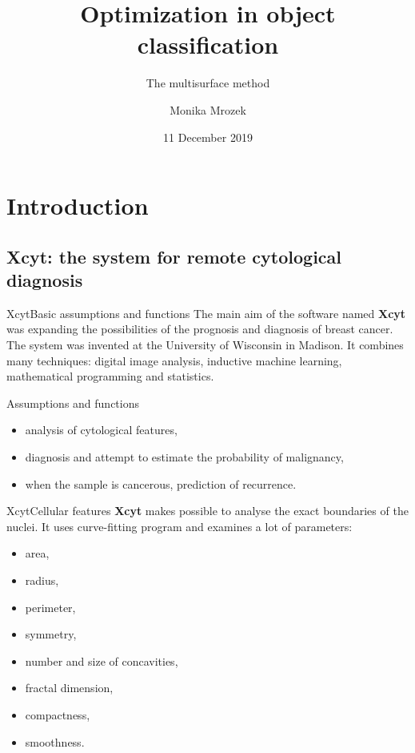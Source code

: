 \documentclass{beamer}
\begin{document}
\title{Optimization in object classification}
\subtitle{The multisurface method}
\author{Monika Mrozek} 
\date{11 December 2019} 

\frame{\titlepage} 


\section{Introduction}

\subsection{Xcyt: the system for remote cytological diagnosis}
\begin{frame}{Xcyt}{Basic assumptions and functions}
The main aim of the software named \textbf{Xcyt} was expanding the possibilities of the prognosis and diagnosis of breast cancer. The system was invented at the University of Wisconsin in Madison\cite{s}. It combines many techniques: digital image analysis, inductive machine learning, mathematical programming and statistics.

\begin{block}{Assumptions and functions}
\begin{itemize}
   \item analysis of cytological features,
   \item diagnosis and attempt to estimate the probability of malignancy,
   \item when the sample is cancerous, prediction of recurrence.
\end{itemize}
\end{block}
\end{frame}


\begin{frame}{Xcyt}{Cellular features}
\textbf{Xcyt} makes possible to analyse the exact boundaries of the nuclei. It uses curve-fitting program 
and examines a lot of parameters:
\begin{block}

\begin{itemize}
   \item area,%
   \item radius,
   \item perimeter,
   \item symmetry,
   \item number and size of concavities,
   \item fractal dimension,
   \item compactness,
   \item smoothness.
   
\end{itemize}
\end{block}


\end{frame}
\end{document}
